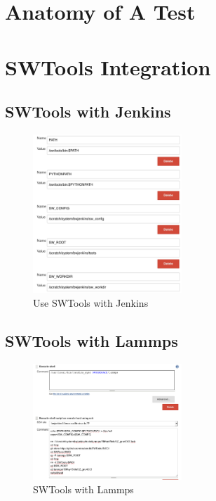\documentclass[10pt, conference, compsocconf]{IEEEtran}
\begin{document}
\section{Anatomy of A Test}
\label{sec:TestAnatomy}


\section{SWTools Integration}
\label{sec:SWToolsIntegration}
\subsection{SWTools with Jenkins}
\begin{figure}[H]
\centering
\includegraphics[width=0.5\textwidth]{swtools-Jenkins}
\caption{ Use SWTools with Jenkins }
\label{fig:swtools-jenkins}
\end{figure}

\subsection{SWTools with Lammps}
\begin{figure}[H]
\centering
\includegraphics[width=0.5\textwidth]{swtools-lammps-jenkins}
\caption{ SWTools with Lammps }
\label{fig:swtools-lammps-jenkins}
\end{figure}
\end{document}
